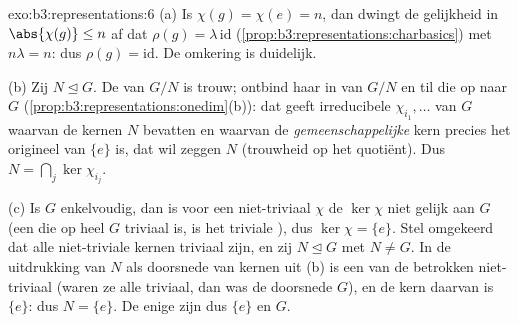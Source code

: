 \begin{solution}{exo:b3:representations:6}
(a) Is $\chi(g) = \chi(e) = n$, dan dwingt de gelijkheid in
$\abs{\chi(g)} \leq n$ af dat $\rho(g) = \lambda\,\mathrm{id}$
(\cref{prop:b3:representations:charbasics}) met $n\lambda = n$:
dus $\rho(g) = \mathrm{id}$. De omkering is duidelijk.

(b) Zij $N \trianglelefteq G$. De  van
$G/N$ is trouw; ontbind haar in  van
$G/N$ en til die op naar $G$
(\cref{prop:b3:representations:onedim}(b)): dat geeft irreducibele
 $\chi_{i_1}, \dots$ van $G$ waarvan de kernen $N$
bevatten en waarvan de \emph{gemeenschappelijke} kern precies het
origineel van $\{e\}$ is, dat wil zeggen $N$ (trouwheid op het
quotiënt). Dus $N = \bigcap_j \ker\chi_{i_j}$.

(c) Is $G$ enkelvoudig, dan is voor een niet-triviaal 
$\chi$ de  $\ker\chi$ niet gelijk aan $G$ (een
 die op heel $G$ triviaal is, is het
triviale ), dus $\ker\chi = \{e\}$. Stel omgekeerd dat
alle niet-triviale kernen triviaal zijn, en zij $N
\trianglelefteq G$ met $N \neq G$. In de uitdrukking van $N$ als
doorsnede van kernen uit (b) is een van de betrokken 
niet-triviaal (waren ze alle triviaal, dan was de doorsnede $G$),
en de kern daarvan is $\{e\}$: dus $N = \{e\}$. De enige
 zijn dus $\{e\}$ en $G$.
\end{solution}

